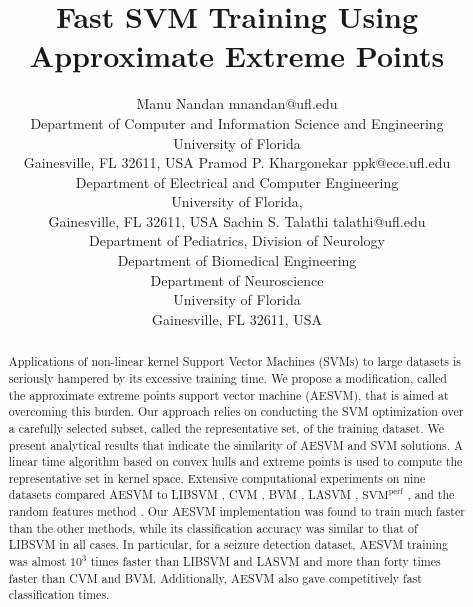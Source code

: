 \documentclass[twoside]{article}
\begin{document}
\title{Fast SVM Training Using Approximate Extreme Points}

\author{\name Manu Nandan \email mnandan@ufl.edu \\
       \addr Department of Computer and Information Science and Engineering\\
       University of Florida\\
       Gainesville, FL 32611, USA
       \AND
       \name Pramod P. Khargonekar \email ppk@ece.ufl.edu \\
       \addr Department of Electrical and Computer Engineering\\
       University of Florida,\\
       Gainesville, FL 32611, USA
       \AND
       \name Sachin S. Talathi \email talathi@ufl.edu \\
       \addr Department of Pediatrics, Division of Neurology\\
						 Department of Biomedical Engineering\\
						 Department of Neuroscience\\
       University of Florida\\
       Gainesville, FL 32611, USA}


\editor{}

\maketitle

\begin{abstract}%
Applications of non-linear kernel Support Vector Machines (SVMs) to  large datasets is seriously hampered by its excessive training time. We propose a modification, called the approximate extreme points support vector machine (AESVM), that is aimed at overcoming this burden. Our approach relies on conducting the SVM optimization over a carefully selected subset, called the representative set, of the training dataset. We present analytical results that indicate the similarity of AESVM and SVM solutions. A linear time algorithm based on convex hulls and extreme points is used to compute the representative set in kernel space. Extensive computational experiments on nine datasets compared AESVM to LIBSVM \citep{LIBSVM}, CVM \citep{Tsang05} , BVM \citep{Tsang07}, LASVM \citep{Bordes05}, $\text{SVM}^{\text{perf}}$ \citep{Joachims09}, and the random features method \citep{rahimi07}. Our AESVM implementation was found to train much faster than the other methods, while its classification accuracy was similar to that of LIBSVM in all cases. In particular, for a seizure detection dataset, AESVM training was almost $10^3$ times faster than LIBSVM and LASVM and more than forty times faster than CVM and BVM.  Additionally, AESVM also gave competitively fast classification times.
\end{abstract}
\end{document}
